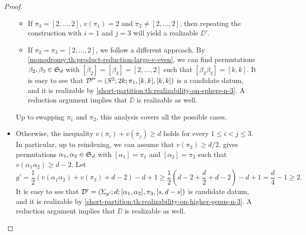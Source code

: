 \begin{proof}
\begin{itemize}
\begin{itemize}
\item If $\pi_3=[2,\ldots,2]$, $v(\pi_1)=2$ and $\pi_2\neq [2,\ldots,2]$, then repeating the construction with $i=1$ and $j=3$ will yield a realizable $\DD'$.
\item If $\pi_2=\pi_3=[2,\ldots,2]$, we follow a different approach. By \cref{monodromy:th:product-reduction-large-v-even}, we can find permutations $\beta_2,\beta_3\in\symgroup[d]$ with $[\beta_2]=[\beta_3]=[2,\ldots,2]$ such that $[\beta_2\beta_3]=[k,k]$. It is easy to see that $\mathcal{D}''=(S^2{};2k;\pi_1,[k,k],[k,k])$ is a candidate datum, and it is realizable by \cref{short-partition:th:realizability-on-sphere-n-3}. A reduction argument implies that $\DD$ is realizable as well.
\end{itemize}

Up to swapping $\pi_1$ and $\pi_2$, this analysis covers all the possible cases.
\item Otherwise, the inequality $v(\pi_i)+v(\pi_j)\ge d$ holds for every $1\le i<j\le 3$. In particular, up to reindexing, we can assume that $v(\pi_3)\ge d/2$.  gives permutations $\alpha_1,\alpha_2\in\symgroup[d]$ with $[\alpha_1]=\pi_1$ and $[\alpha_2]=\pi_2$ such that $v(\alpha_1\alpha_2)\ge d-2$. Let
\[
g'=\frac{1}{2}(v(\alpha_1\alpha_2)+v(\pi_3)+d-2)-d+1\ge\frac{1}{2}\left(d-2+\frac{d}{2}+d-2\right)-d+1=\frac{d}{4}-1\ge 2.
\]
It is easy to see that $\mathcal{D}'=(\Sigma_{g'};d;[\alpha_1,\alpha_2],\pi_3,[s,d-s])$ is candidate datum, and it is realizable by \cref{short-partition:th:realizability-on-higher-genus-n-3}. A reduction argument implies that $\DD$ is realizable as well.
\end{itemize}


\end{proof}
